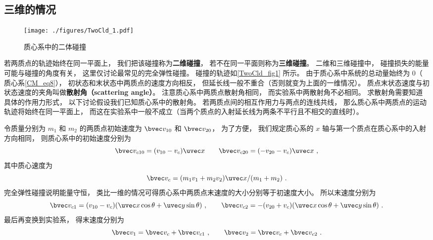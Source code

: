 \subsection{三维的情况}

\begin{figure}[ht]
\centering
\texttt{[image: ./figures/TwoCld\_1.pdf]}
\caption{质心系中的二体碰撞} \label{TwoCld_fig1}
\end{figure}

若两质点的轨迹始终在同一平面上， 我们把该碰撞称为\textbf{二维碰撞}， 若不在同一平面则称为\textbf{三维碰撞}。 二维和三维碰撞中， 碰撞损失的能量可能与碰撞的角度有关， 这里仅讨论最常见的完全弹性碰撞。
碰撞的轨迹如\autoref{TwoCld_fig1} 所示。 由于质心系中系统的总动量始终为 0（ 质心系\autoref{CM_eq8}），  初状态和末状态中两质点的速度方向相反， 但延长线一般不重合（否则就变为上面的一维情况）。 质点末状态速度与初状态速度的夹角叫做\textbf{散射角（scattering angle）}。 注意质心系中两质点散射角相同， 而实验系中两散射角不必相同。 求散射角需要知道具体的作用力形式， 以下讨论假设我们已知质心系中的散射角。%
若两质点间的相互作用力与两点的连线共线， 那么质心系中两质点的运动轨迹将始终在同一平面上， 而这在实验系中一般不成立（当两个质点的入射延长线为两条不平行且不相交的直线时）。

令质量分别为 $m_1$ 和 $m_2$ 的两质点初始速度为 $\bvec v_{10}$ 和 $\bvec v_{20}$， 为了方便， 我们规定质心系的 $x$ 轴与第一个质点在质心系中的入射方向相同， 则质心系中的初始速度分别为
\begin{equation}
\bvec v_{c10} = (v_{10} - v_c)\uvec x \qquad \bvec v_{c20} = (-v_{20} - v_c) \uvec x~,
\end{equation}
其中质心速度为
\begin{equation}
\bvec v_c = (m_1 v_1 + m_2 v_2)\uvec x/(m_1 + m_2)~.
\end{equation}
完全弹性碰撞说明能量守恒， 类比一维的情况可得质心系中两质点末速度的大小分别等于初速度大小。 所以末速度分别为
\begin{equation}
\bvec v_{c1} = (v_{10} - v_c)(\uvec x\cos\theta + \uvec y\sin\theta)~, \qquad
\bvec v_{c2} = -(v_{20} + v_c)(\uvec x\cos\theta + \uvec y\sin\theta)~.
\end{equation}
最后再变换到实验系， 得末速度分别为
\begin{equation}
\bvec v_1 = \bvec v_c + \bvec v_{c1}~, \qquad
\bvec v_2 = \bvec v_c + \bvec v_{c2}~.
\end{equation}

